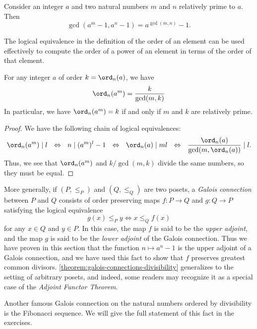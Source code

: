 \begin{corollary}
  Consider an integer $a$ and two natural numbers $m$ and $n$ relatively prime to $a$. Then
  \begin{equation*}
    \gcd(a^m-1,a^n-1)=a^{\gcd(m,n)}-1.
  \end{equation*}
\end{corollary}

The logical equivalence in the definition of the order of an element can be used effectively to compute the order of a power of an element in terms of the order of that element.

\begin{proposition}\label{proposition:order-power}
  For any integer $a$ of order $k=\ord_n(a)$, we have
  \begin{equation*}
    \ord_n(a^m)=\frac{k}{\gcd(m,k)}
  \end{equation*}
  In particular, we have $\ord_n(a^m)=k$ if and only if $m$ and $k$ are relatively prime.
\end{proposition}

\begin{proof}
  We have the following chain of logical equivalences:
  \begin{equation*}
    \ord_n(a^m) \mid l ~~\Leftrightarrow~~ n \mid (a^m)^l-1
    ~~\Leftrightarrow~~ \ord_n(a) \mid ml
    ~~\Leftrightarrow~~ \frac{\ord_n(a)}{\gcd(m,\ord_n(a))} \mid l.
  \end{equation*}
  Thus, we see that $\ord_n(a^m)$ and $k/\gcd(m,k)$ divide the same numbers, so they must be equal.
\end{proof}

\begin{remark}
  More generally, if $(P,\leq_P)$ and $(Q,\leq_Q)$ are two posets, a \emph{Galois connection} between $P$ and $Q$ consists of order preserving maps $f:P\to Q$ and $g:Q\to P$ satisfying the logical equivalence
  \begin{equation*}
    g(x)\leq_P y \Leftrightarrow x\leq_Q f(x)
  \end{equation*}
  for any $x\in Q$ and $y\in P$. In this case, the map $f$ is said to be the \emph{upper adjoint}, and the map $g$ is said to be the \emph{lower adjoint} of the Galois connection. Thus we have proven in this section that the function $n\mapsto a^n-1$ is the upper adjoint of a Galois connection, and we have used this fact to show that $f$ preserves greatest common divisors. \cref{theorem:galois-connections-divisibility} generalizes to the setting of arbitrary posets, and indeed, some readers may recognize it as a special case of the \emph{Adjoint Functor Theorem}.

  Another famous Galois connection on the natural numbers ordered by divisibility is the Fibonacci sequence. We will give the full statement of this fact in the exercises.
\end{remark}

